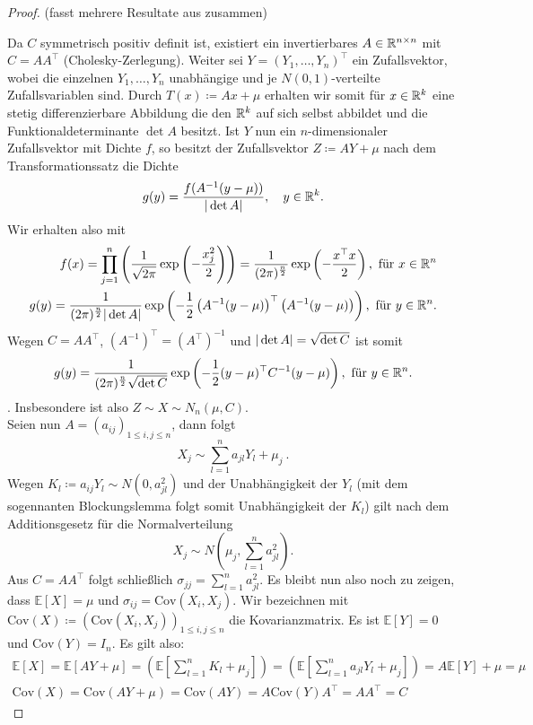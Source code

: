 \begin{proof}(fasst mehrere Resultate aus \cite{brokate2016grundwissen} zusammen)
	
	Da $ C $ symmetrisch positiv definit ist, existiert ein invertierbares $ A \in \mathbb{R}^{n \times n} $ mit $ C = AA^{\top} $ (Cholesky-Zerlegung).
	Weiter sei $ Y = (Y_1,\dots,Y_n)^{\top} $ ein Zufallsvektor, wobei die einzelnen $ Y_1,\dots,Y_n $ unabhängige und je $ N(0,1) $-verteilte Zufallsvariablen sind. 
	Durch $ T(x) \coloneqq Ax + \mu $ erhalten wir somit für $ x \in \mathbb{R}^k $ eine stetig differenzierbare Abbildung die den $ \mathbb{R}^k $ auf sich selbst abbildet und die Funktionaldeterminante $ \det A$ besitzt.
	Ist $ Y $ nun ein $ n $-dimensionaler Zufallsvektor mit Dichte $ f $, so besitzt der Zufallsvektor $ Z \coloneqq  AY + \mu$ nach dem Transformationssatz die Dichte
	\[
		g(y) = \frac{f(A^{-1}(y-\mu))}{| \det A |}, \quad y \in \mathbb{R}^k .
	\]
	Wir erhalten also mit 
	\begin{align*}
		f(x) = \prod_{j=1}^n \left( \frac{1}{\sqrt{2\pi}}\exp\left(-\frac{x_j^2}{2}\right) \right) = \frac{1}{(2\pi)^{\frac{n}{2}}} \exp \left( - \frac{x^{\top}x}{2}\right), \text{ für } x \in \mathbb{R}^n \\
		g(y) = \frac{1}{(2\pi)^{\frac{n}{2}}| \det A |} \exp \left( - \frac{1}{2} \left( A^{-1}(y-\mu)\right)^{\top}\left( A^{-1}(y-\mu)\right)\right), \text{ für }y \in \mathbb{R}^n .
	\end{align*}
	Wegen $ C = A A^{\top} $, $ (A^{-1})^{\top} = (A^{\top})^{-1} $ und $ | \det A | = \sqrt{\det C} $ ist somit 
	\[
		g(y) = \frac{1}{(2\pi)^{\frac{n}{2}}\sqrt{\det C}} \exp \left( - \frac{1}{2} (y-\mu)^{\top}C^{-1} (y-\mu)\right), \text{ für }y \in \mathbb{R}^n.
	\]. 
	Insbesondere ist also $ Z \sim X \sim N_n(\mu,C) $.\\
	Seien nun $ A = (a_{ij})_{1 \leq i,j \leq n} $, dann folgt
	\[
		X_j \sim \sum_{l=1}^n a_{jl} Y_l + \mu_j \ .
	\]
	Wegen $ K_l \coloneqq a_{ij} Y_l  \sim N(0,a_{jl}^2) $ und der Unabhängigkeit der $ Y_l $ (mit dem sogennanten Blockungslemma folgt somit Unabhängigkeit der $ K_l $) gilt nach dem Additionsgesetz für die Normalverteilung 
	\[
		X_j\sim N \left( \mu_j,\sum_{l=1}^{n}a_{jl}^2 \right).
	\]
	Aus $ C = A A^{\top}  $ folgt schließlich $ \sigma_{jj} = \sum_{l=1}^{n} a_{jl}^2 $.
	Es bleibt nun also noch zu zeigen, dass $ \mathbb{E}[X] = \mu $ und $ \sigma_{ij} = \text{Cov}(X_i,X_j) $.
	Wir bezeichnen mit $ \text{Cov}(X) \coloneqq (\text{Cov}(X_i,X_j))_{1 \leq i,j \leq n} $
	die Kovarianzmatrix.
	Es ist $ \mathbb{E}[Y] = 0 $ und  $\text{Cov}(Y) = I_n $.
	Es gilt also:
	\begin{align*}
		\mathbb{E}[X] = \mathbb{E}[AY + \mu] = (\mathbb{E}[\sum_{l=1}^{n}K_l+\mu_j]) =(\mathbb{E}[\sum_{l=1}^{n}a_{jl}Y_l+\mu_j])= A \mathbb{E}[Y] + \mu = \mu \\
		\text{Cov}(X) = \text{Cov}(AY + \mu) =  \text{Cov}(AY) = A \text{Cov}(Y) A^{\top} = AA^{\top} = C
	\end{align*}	
	
\end{proof}
